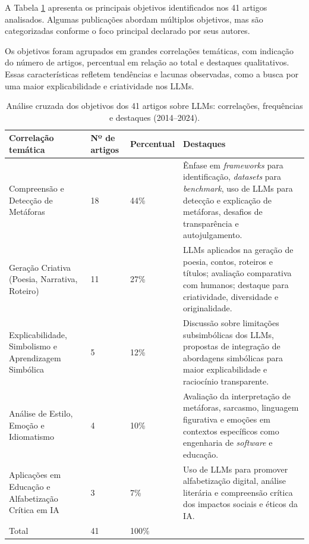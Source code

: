 \documentclass[portuguese]{textolivre}
\begin{document}
A Tabela \ref{tab-3} apresenta os principais objetivos identificados nos 41 artigos analisados. Algumas publicações abordam múltiplos objetivos, mas são categorizadas conforme o foco principal declarado por seus autores.

Os objetivos foram agrupados em grandes correlações temáticas, com indicação do número de artigos, percentual em relação ao total e destaques qualitativos. Essas características refletem tendências e lacunas observadas, como a busca por uma maior explicabilidade e criatividade nos LLMs.

\begin{table}[h!]
\centering
\begin{threeparttable}
\caption{Análise cruzada dos objetivos dos 41 artigos sobre LLMs: correlações, frequências e destaques (2014--2024).}
\label{tab-3}
\small
\begin{tabular}{p{4cm} p{2cm} p{2cm} p{5cm}}
\toprule
Correlação temática & Nº de artigos & Percentual & Destaques \\
\midrule
Compreensão e Detecção de Metáforas & 18 & 44\% & Ênfase em \textit{frameworks} para identificação, \textit{datasets} para \textit{benchmark}, uso de LLMs para detecção e explicação de metáforas, desafios de transparência e autojulgamento. \\

Geração Criativa (Poesia, Narrativa, Roteiro) & 11 & 27\% & LLMs aplicados na geração de poesia, contos, roteiros e títulos; avaliação comparativa com humanos; destaque para criatividade, diversidade e originalidade. \\

Explicabilidade, Simbolismo e Aprendizagem Simbólica & 5 & 12\% & Discussão sobre limitações subsimbólicas dos LLMs, propostas de integração de abordagens simbólicas para maior explicabilidade e raciocínio transparente. \\

Análise de Estilo, Emoção e Idiomatismo & 4 & 10\% & Avaliação da interpretação de metáforas, sarcasmo, linguagem figurativa e emoções em contextos específicos como engenharia de \textit{software} e educação. \\

Aplicações em Educação e Alfabetização Crítica em IA & 3 & 7\% & Uso de LLMs para promover alfabetização digital, análise literária e compreensão crítica dos impactos sociais e éticos da IA. \\
\addlinespace
Total & 41 & 100\% & \\ 
\bottomrule
\end{tabular}
\end{threeparttable}
\end{table}
\end{document}
